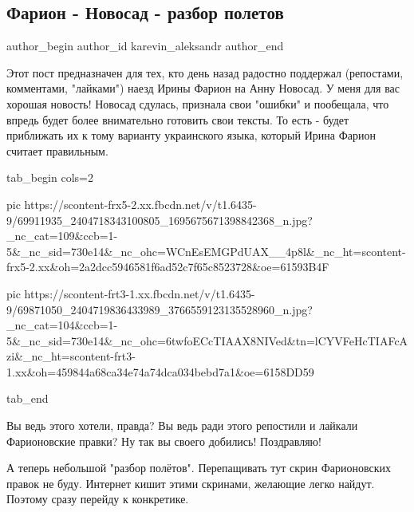  
 
 
 
 
 
\subsection{Фарион - Новосад - разбор полетов}
\label{sec:04_09_2019.fb.karevin_aleksandr.1.farion_novosad_mova}
 
\ifcmt
 author_begin
   author_id karevin_aleksandr
 author_end
\fi

Этот пост предназначен для тех, кто день назад радостно поддержал (репостами,
комментами, "лайками") наезд Ирины Фарион на Анну Новосад. У меня для вас
хорошая новость! Новосад сдулась, признала свои "ошибки" и пообещала, что
впредь будет более внимательно готовить свои тексты. То есть - будет приближать
их к тому варианту украинского языка, который Ирина Фарион считает правильным.

\ifcmt
  tab_begin cols=2

     pic https://scontent-frx5-2.xx.fbcdn.net/v/t1.6435-9/69911935_2404718343100805_1695675671398842368_n.jpg?_nc_cat=109&ccb=1-5&_nc_sid=730e14&_nc_ohc=WCnEsEMGPdUAX__4p8l&_nc_ht=scontent-frx5-2.xx&oh=2a2dcc5946581f6ad52c7f65c8523728&oe=61593B4F

     pic https://scontent-frt3-1.xx.fbcdn.net/v/t1.6435-9/69871050_2404719836433989_3766559123135528960_n.jpg?_nc_cat=104&ccb=1-5&_nc_sid=730e14&_nc_ohc=6twfoECcTIAAX8NIVed&tn=lCYVFeHcTIAFcAzi&_nc_ht=scontent-frt3-1.xx&oh=459844a68ca34e74a74dca034bebd7a1&oe=6158DD59

  tab_end
\fi

Вы ведь этого хотели, правда? Вы ведь ради этого репостили и лайкали
Фарионовские правки? Ну так вы своего добились! Поздравляю!

А теперь небольшой "разбор полётов". Перепащивать тут скрин Фарионовских правок
не буду. Интернет кишит этими скринами, желающие легко найдут. Поэтому сразу
перейду к конкретике.


